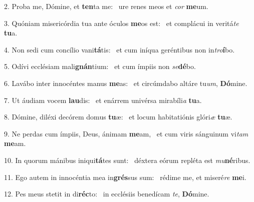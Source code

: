 2. Proba me, Dómine, et \textbf{ten}ta me: \ast\  ure renes meos et \textit{cor} \textbf{me}um.\

3. Quóniam misericórdia tua ante óculos \textbf{me}os est: \ast\  et complácui in veritá\textit{te} \textbf{tu}a.\

4. Non sedi cum concílio vani\textbf{tá}tis: \ast\  et cum iníqua geréntibus non in\textit{tro}\textbf{í}bo.\

5. Odívi ecclésiam mali\textbf{gnán}tium: \ast\  et cum ímpiis non \textit{se}\textbf{dé}bo.\

6. Lavábo inter innocéntes manus \textbf{me}as: \ast\  et circúmdabo altáre tu\textit{um}, \textbf{Dó}mine.\

7. Ut áudiam vocem \textbf{lau}dis: \ast\  et enárrem univérsa mirabíli\textit{a} \textbf{tu}a.\

8. Dómine, diléxi decórem domus \textbf{tu}æ: \ast\  et locum habitatiónis glóri\textit{æ} \textbf{tu}æ.\

9. Ne perdas cum ímpiis, Deus, ánimam \textbf{me}am, \ast\  et cum viris sánguinum vi\textit{tam} \textbf{me}am.\

10. In quorum mánibus iniqui\textbf{tá}tes sunt: \ast\  déxtera eórum repléta est \textit{mu}\textbf{né}ribus.\

11. Ego autem in innocéntia mea in\textbf{grés}sus sum: \ast\  rédime me, et miseré\textit{re} \textbf{me}i.\

12. Pes meus stetit in di\textbf{réc}to: \ast\  in ecclésiis benedícam \textit{te}, \textbf{Dó}mine.\

